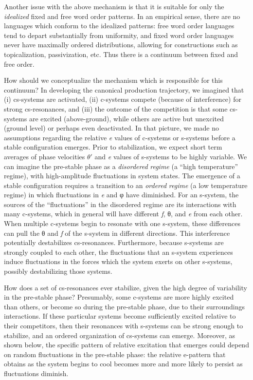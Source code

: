   Another issue with the above mechanism is that it is suitable for only the \textit{idealized} fixed and free word order patterns. In an empirical sense, there are no languages which conform to the idealized patterns: free word order languages tend to depart substantially from uniformity, and fixed word order languages never have maximally ordered distributions, allowing for constructions such as topicalization, passivization, etc. Thus there is a continuum between fixed and free order. 

  How should we conceptualize the mechanism which is responsible for this continuum? In developing the canonical production trajectory, we imagined that (i) cs-systems are activated, (ii) c-systems compete (because of interference) for strong cs-resonances, and (iii) the outcome of the competition is that some cs-systems are excited (above-ground), while others are active but unexcited (ground level) or perhaps even deactivated. In that picture, we made no assumptions regarding the relative \textit{e} values of c-systems or s-systems before a stable configuration emerges. Prior to stabilization, we expect short term averages of phase velocities $\theta ′$ and \textit{e} values of s-systems to be highly variable. We can imagine the pre-stable phase as a \textit{disordered} \textit{regime} (a “high temperature” regime), with high-amplitude fluctuations in system states. The emergence of a stable configuration requires a transition to an \textit{ordered} \textit{regime} (a low temperature regime) in which fluctuations in \textit{e} and φ have diminished. For an s-system, the sources of the “fluctuations” in the disordered regime are its interactions with many c-systems, which in general will have different \textit{f}, θ, and \textit{e} from each other. When multiple c-systems begin to resonate with one s-system, these differences can pull the θ and \textit{f} of the s-system in different directions. This interference potentially destabilizes cs-resonances. Furthermore, because s-systems are strongly coupled to each other, the fluctuations that an s-system experiences induce fluctuations in the forces which the system exerts on other s-systems, possibly destabilizing those systems.

  How does a set of cs-resonances ever stabilize, given the high degree of variability in the pre-stable phase? Presumably, some c-systems are more highly excited than others, or become so during the pre-stable phase, due to their surroundings interactions. If these particular systems become sufficiently excited relative to their competitors, then their resonances with s-systems can be strong enough to stabilize, and an ordered organization of cs-systems can emerge. Moreover, as shown below, the specific pattern of relative excitation that emerges could depend on random fluctuations in the pre-stable phase: the relative e-pattern that obtains as the system begins to cool becomes more and more likely to persist as fluctuations diminish.

